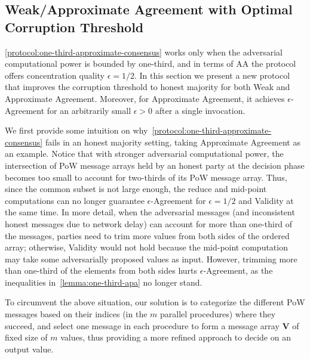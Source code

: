 \subsection{Weak/Approximate Agreement with Optimal Corruption Threshold}
\label{subsec:apa-honst-majority}

\cref{protocol:one-third-approximate-consensus} works only when the adversarial computational power is bounded by one-third, and in terms of AA the protocol offers concentration quality $\epsilon = 1 / 2$.
%
In this section we present a new protocol that improves the corruption threshold to honest majority for both Weak and Approximate Agreement.
%
Moreover, for Approximate Agreement, it achieves $\epsilon$-Agreement for an arbitrarily small $\epsilon > 0$ after a single invocation.

We first provide some intuition on why~\cref{protocol:one-third-approximate-consensus} fails in an honest majority setting, taking Approximate Agreement as an example.
%
Notice that with stronger adversarial computational power, the intersection of PoW message arrays held by an honest party at the decision phase becomes too small to account for two-thirds of its PoW message array.
%
Thus, since the common subset is not large enough, the \textsf{reduce} and mid-point computations can no longer guarantee $\epsilon$-Agreement for $\epsilon = 1 / 2$ and Validity at the same time.
%
In more detail, when the adversarial messages (and inconsistent honest messages due to network delay) can account for more than one-third of the messages, parties need to trim more values from both sides of the ordered array; otherwise, Validity would not hold because the mid-point computation may take some adversarially proposed values as input.
%
However, trimming more than one-third of the elements from both sides hurts $\epsilon$-Agreement, as the inequalities in~\cref{lemma:one-third-apa} no longer stand.

To circumvent the above situation, our solution is to categorize the different PoW messages based on their indices (in the $m$ parallel procedures) where they succeed, and select one message in each procedure to form a message array \textbf{V} of fixed size of $m$ values, thus providing a more refined approach to decide on an output value.

